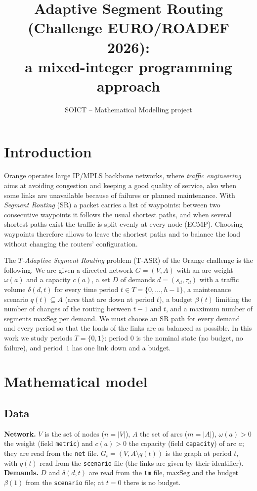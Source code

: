 \documentclass[11pt,a4paper]{article}
\title{Adaptive Segment Routing (Challenge EURO/ROADEF 2026):\\ a mixed-integer programming approach}
\author{SOICT -- Mathematical Modelling project}
\date{}
\begin{document}
\maketitle

\section{Introduction}
Orange operates large IP/MPLS backbone networks, where \emph{traffic engineering} aims at avoiding congestion and keeping a good quality of service, also when some links are unavailable because of failures or planned maintenance. With \emph{Segment Routing} (SR) a packet carries a list of waypoints: between two consecutive waypoints it follows the usual shortest paths, and when several shortest paths exist the traffic is split evenly at every node (ECMP). Choosing waypoints therefore allows to leave the shortest paths and to balance the load without changing the routers' configuration.

The \emph{$T$-Adaptive Segment Routing} problem (T-ASR) of the Orange challenge is the following. We are given a directed network $G=(V,A)$ with an arc weight $\omega(a)$ and a capacity $c(a)$, a set $D$ of demands $d=(s_d,\tau_d)$ with a traffic volume $\delta(d,t)$ for every time period $t\in T=\{0,\dots,h-1\}$, a maintenance scenario $q(t)\subseteq A$ (arcs that are down at period $t$), a budget $\beta(t)$ limiting the number of changes of the routing between $t-1$ and $t$, and a maximum number of segments $\mathrm{maxSeg}$ per demand. We must choose an SR path for every demand and every period so that the loads of the links are as balanced as possible. In this work we study periods $T=\{0,1\}$: period $0$ is the nominal state (no budget, no failure), and period~$1$ has one link down and a budget.

\section{Mathematical model}
\subsection{Data}
\textbf{Network.} $V$ is the set of nodes ($n=|V|$), $A$ the set of arcs ($m=|A|$), $\omega(a)>0$ the weight (field \texttt{metric}) and $c(a)>0$ the capacity (field \texttt{capacity}) of arc $a$; they are read from the \texttt{net} file. $G_t=(V,A\setminus q(t))$ is the graph at period $t$, with $q(t)$ read from the \texttt{scenario} file (the links are given by their identifier). \textbf{Demands.} $D$ and $\delta(d,t)$ are read from the \texttt{tm} file, $\mathrm{maxSeg}$ and the budget $\beta(1)$ from the \texttt{scenario} file; at $t=0$ there is no budget.
\end{document}
